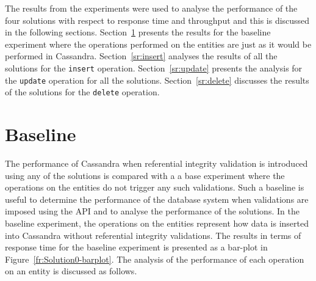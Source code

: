 % 

 The results from the experiments were used to
analyse the performance of the four solutions with respect to  response
time and throughput and this is discussed in the following sections.
Section~\ref{sr:baseline} presents the results for the baseline experiment where 
the operations performed on the entities are just as it would be performed in
Cassandra. Section~\ref{sr:insert} analyses the results of all the solutions
for the \texttt{insert} operation. Section~\ref{sr:update} presents the analysis
for the \texttt{update} operation for all the solutions. Section~\ref{sr:delete}
discusses the results of the solutions for the \texttt{delete} operation. 


\section{Baseline}\label{sr:baseline}
The performance of Cassandra when referential
integrity validation is introduced using any of the solutions is compared with a
a base experiment where the operations on the entities do not trigger any
such validations. Such a baseline is useful to determine the
performance of the database system when validations are imposed using the
\ac{API} and to analyse the performance of the solutions.
In the baseline experiment, the operations on the entities represent how
data is inserted into Cassandra without referential integrity validations. The
results in terms of response time for the baseline experiment is presented as
a bar-plot in Figure~\ref{fr:Solution0-barplot}. The analysis of
the performance of each operation on an entity is discussed as follows.


